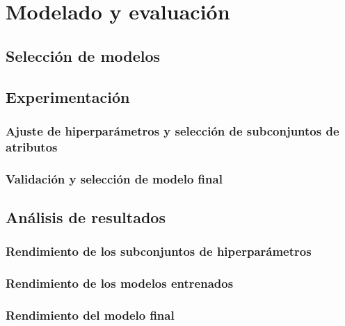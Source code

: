 \chapter{Modelado y evaluación}

\section{Selección de modelos}

\section{Experimentación}

\subsection{Ajuste de hiperparámetros y selección de subconjuntos de atributos}

\subsection{Validación y selección de modelo final}

\section{Análisis de resultados}

\subsection{Rendimiento de los subconjuntos de hiperparámetros}

\subsection{Rendimiento de los modelos entrenados}

\subsection{Rendimiento del modelo final}